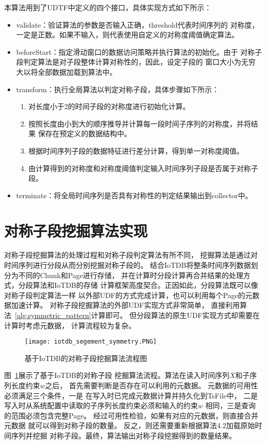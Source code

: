 本算法用到了UDTF中定义的四个接口，具体实现方式如下所示：
\begin{itemize}
\item validate：验证算法的参数是否输入正确，threshold代表时间序列的
      对称度，一定是正数。如果不输入，则代表使用自定义的对称度阈值确定算法。
\item beforeStart：指定滑动窗口的数据访问策略并执行算法的初始化。由于
      对称子段判定算法是对子段整体计算对称性的，因此，设定子段的
      窗口大小为无穷大以将全部数据加载到算法中。
\item transform：执行全局算法以判定对称子段，具体步骤如下所示：
    \begin{enumerate}
        \item 对长度小于2的时间子段的对称度进行初始化计算。
        \item 按照长度由小到大的顺序推导并计算每一段时间子序列的对称度，并将结果
              保存在预定义的数据结构中。
        \item 根据时间序列子段的数据特征进行差分计算，得到单一对称度阈值。
        \item 由计算得到的对称度和对称度阈值判定输入时间序列子段是否属于对称子段。
    \end{enumerate}
\item terminate：将全局时间序列是否具有对称性的判定结果输出到collector中。
\end{itemize}

\section{对称子段挖掘算法实现}

对称子段挖掘算法的处理过程和对称子段判定算法有所不同，
挖掘算法是通过对时间序列进行分段从而分别挖掘对称子段的。
结合IoTDB将整条时间序列数据划分为不同的Chunk和Page进行存储，
并在计算时分段计算再合并结果的处理方式，分段算法和IoTDB的存储
计算框架高度契合。正因如此，分段算法既可以像对称子段判定算法一样
以外部UDF的方式完成计算，也可以利用每个Page的元数据加速计算。
对称子段挖掘算法的外部UDF实现方式非常简单，
直接利用算法~\ref{alg:symmetric_pattern}计算即可。
但分段算法的原生UDF实现方式却需要在计算时考虑元数据，
计算流程较为复杂。

\begin{figure}
    \centering
    \texttt{[image: iotdb\_segement\_symmetry.PNG]}
    \caption{基于IoTDB的对称子段挖掘算法流程图}
    \label{fig:iotdb_segement}
  \end{figure}

图~\ref{fig:iotdb_segement}展示了基于IoTDB的对称子段
挖掘算法流程。算法在读入时间序列$X$和子序列长度约束$w$之后，
首先需要判断是否存在可以利用的元数据。
元数据的可用性必须满足三个条件，一是
在写入时已完成元数据计算并持久化到TsFile中，
二是写入时从系统配置中读取的子序列长度约束必须和输入的约束$w$
相同，三是查询的范围必须包含完整Page。
经过可用性检验，如果有对应的元数据，则直接合并元数据
就可以得到对称子段的数量。
反之，则还需要重新根据算法4.2加载原始时间序列并挖掘
对称子段。最终，算法输出对称子段挖掘得到的数量结果。

